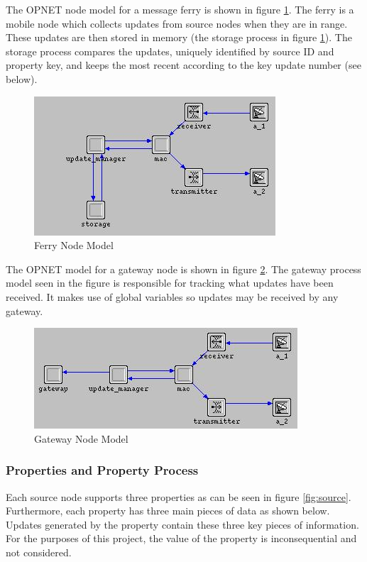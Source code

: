 The OPNET node model for a message ferry is shown in figure \ref{fig:Ferry}.
The ferry is a mobile node which collects updates from source nodes when they are in range. 
These updates are then stored in memory (the storage process in figure \ref{fig:Ferry}). 
The storage process compares the updates, uniquely identified by source ID and property key, and keeps the most recent according to the key update number (see below).

\begin{figure}[h]
    \centering
    \includegraphics[width=.7\textwidth]{images/ferry}
    \caption{Ferry Node Model}
    \label{fig:Ferry}
\end{figure}

The OPNET model for a gateway node is shown in figure \ref{fig:Gateway}. 
The gateway process model seen in the figure is responsible for tracking what updates have been received.
It makes use of global variables so updates may be received by any gateway.

\begin{figure}[h]
    \centering
    \includegraphics[width=.7\textwidth]{images/gateway}
    \caption{Gateway Node Model}
    \label{fig:Gateway}
\end{figure}

\subsubsection{Properties and Property Process}

Each source node supports three properties as can be seen in figure \ref {fig:source}.
Furthermore, each property has three main pieces of data as shown below. 
Updates generated by the property contain these three key pieces of information.
For the purposes of this project, the value of the property is inconsequential and not considered.

